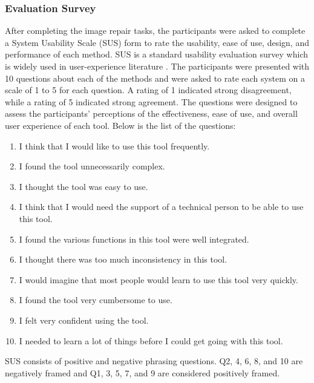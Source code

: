 \documentclass[10pt,twocolumn,letterpaper]{article}
\newcommand{\subscript}[2]{$#1 _ #2$}
\begin{document}
\subsubsection{Evaluation Survey}
After completing the image repair tasks, the participants were asked to complete a System Usability Scale (SUS) form to rate the usability, ease of use, design, and performance of each method. SUS is a standard usability evaluation survey which is widely used in user-experience literature \cite{brooke1996sus}. 
The participants were presented with 10 questions about each of the methods and were asked to rate each system on a scale of 1 to 5 for each question. A rating of 1 indicated strong disagreement, while a rating of 5 indicated strong agreement. The questions were designed to assess the participants' perceptions of the effectiveness, ease of use, and overall user experience of each tool. Below is the list of the questions:

\begin{enumerate}[label=\subscript{\textbf{Q}}{\textbf{{\arabic*}}}]
\itemsep0em 
    \item I think that I would like to use this tool frequently.
    \item I found the tool unnecessarily complex.
    \item I thought the tool was easy to use.
    \item I think that I would need the support of a technical person to be able to use this tool.
    \item I found the various functions in this tool were well integrated.
    \item I thought there was too much inconsistency in this tool.
    \item I would imagine that most people would learn to use this tool very quickly.
    \item I found the tool very cumbersome to use.
    \item I felt very confident using the tool.
    \item I needed to learn a lot of things before I could get going with this tool.



\end{enumerate}

SUS consists of positive and negative phrasing questions. Q2, 4, 6, 8, and 10 are negatively framed and Q1, 3, 5, 7, and 9 are considered positively framed.
\end{document}
